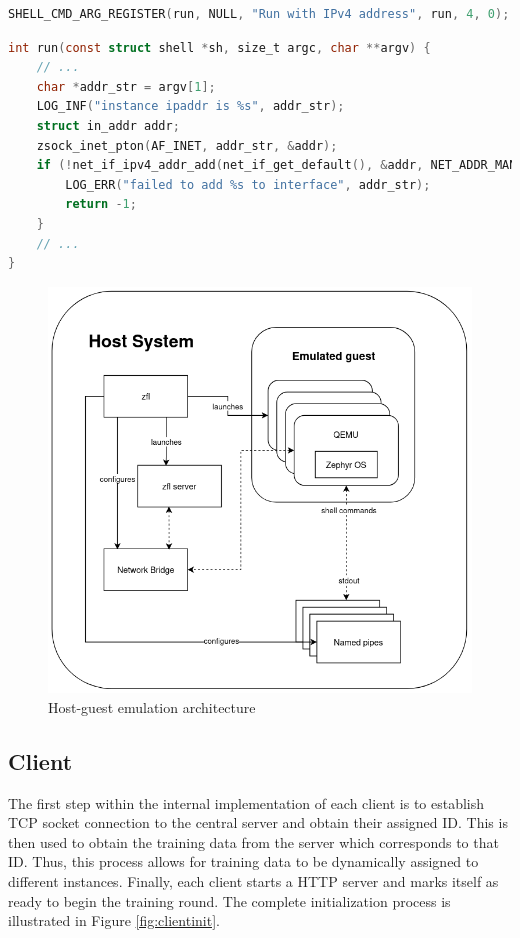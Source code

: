 \documentclass[12pt]{article}
\begin{document}
\begin{lstlisting}[language=C, caption=Registering user defined command ``run'' to the function
pointer run,label={lst:shellcmd}]
SHELL_CMD_ARG_REGISTER(run, NULL, "Run with IPv4 address", run, 4, 0);
\end{lstlisting}

\begin{lstlisting}[language=C, caption=The ``run'' function which performs IP address assignment at
runtime,label={lst:run}]
int run(const struct shell *sh, size_t argc, char **argv) {
    // ...
    char *addr_str = argv[1];
    LOG_INF("instance ipaddr is %s", addr_str);
    struct in_addr addr;
    zsock_inet_pton(AF_INET, addr_str, &addr);
    if (!net_if_ipv4_addr_add(net_if_get_default(), &addr, NET_ADDR_MANUAL, UINT32_MAX)) {
        LOG_ERR("failed to add %s to interface", addr_str);
        return -1;
    }
    // ...
}
\end{lstlisting}

\begin{figure}
  \includegraphics[scale=0.8]{architecture}
  \caption{Host-guest emulation architecture}
  \label{fig:architecture}
\centering
\end{figure}

\subsection{Client}
The first step within the internal implementation of each client is to establish TCP socket connection to the central server and obtain
their assigned ID. This is then used to obtain the training data from the server which corresponds
to that ID. Thus, this process allows for training data to be dynamically assigned to different
instances. Finally, each client starts a HTTP server and marks itself as ready to begin the training round.
The complete initialization process is illustrated in Figure \ref{fig:clientinit}.
\end{document}
